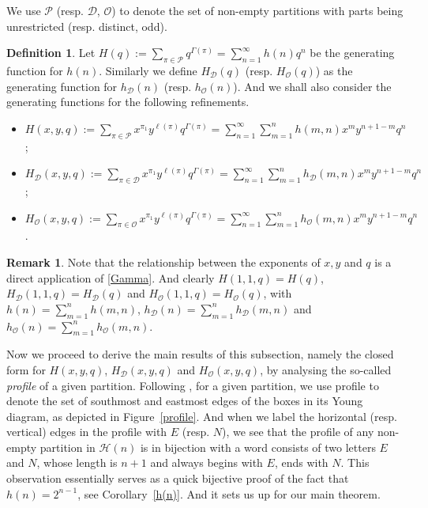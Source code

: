 \documentclass[12pt]{amsart}
\numberwithin{equation}{section}
\theoremstyle{plain}
\theoremstyle{definition}
\newtheorem{Def}[theorem]{Definition}
\newtheorem{remark}[theorem]{Remark}
\def\D{\mathcal{D}}
\def\O{\mathcal{O}}
\def\P{\mathcal{P}}
\def\H{\mathcal{H}}
\begin{document}
We use $\P$ (resp. $\D$, $\O$) to denote the set of non-empty partitions with parts being unrestricted (resp. distinct, odd).
\begin{Def}
Let $H(q):=\sum_{\pi\in\P}q^{\Gamma(\pi)}=\sum_{n=1}^{\infty}h(n)q^n$ be the generating function for $h(n)$. Similarly we define $H_{\D}(q)$ (resp. $H_{\O}(q)$) as the generating function for $h_{\D}(n)$ (resp. $h_{\O}(n)$). And we shall also consider the generating functions for the following refinements.
\begin{itemize}
\item $H(x,y,q):=\sum\limits_{\pi\in\P}x^{\pi_1}y^{\ell(\pi)}q^{\Gamma(\pi)}=\sum\limits_{n=1}^{\infty}\sum\limits_{m=1}^{n}h(m,n)x^my^{n+1-m}q^n$;
\item $H_{\D}(x,y,q):=\sum\limits_{\pi\in\D}x^{\pi_1}y^{\ell(\pi)}q^{\Gamma(\pi)}=\sum\limits_{n=1}^{\infty}\sum\limits_{m=1}^{n}h_{\D}(m,n)x^my^{n+1-m}q^n$;
\item $H_{\O}(x,y,q):=\sum\limits_{\pi\in\O}x^{\pi_1}y^{\ell(\pi)}q^{\Gamma(\pi)}=\sum\limits_{n=1}^{\infty}\sum\limits_{m=1}^{n}h_{\O}(m,n)x^my^{n+1-m}q^n$.
\end{itemize}
\end{Def}
\begin{remark}
Note that the relationship between the exponents of $x,y$ and $q$ is a direct application of \eqref{Gamma}. And clearly $H(1,1,q)=H(q)$, $H_{\D}(1,1,q)=H_{\D}(q)$ and $H_{\O}(1,1,q)=H_{\O}(q)$, with $h(n)=\sum_{m=1}^{n}h(m,n)$, $h_{\D}(n)=\sum_{m=1}^{n}h_{\D}(m,n)$ and $h_{\O}(n)=\sum_{m=1}^{n}h_{\O}(m,n)$.
\end{remark}
Now we proceed to derive the main results of this subsection, namely the closed form for $H(x,y,q)$, $H_{\D}(x,y,q)$ and $H_{\O}(x,y,q)$, by analysing the so-called \emph{profile} of a given partition. Following \cite{KN}, for a given partition, we use profile to denote the set of southmost and eastmost edges of the boxes in its Young diagram, as depicted in Figure~\ref{profile}. And when we label the horizontal (resp. vertical) edges in the profile with $E$ (resp. $N$), we see that the profile of any non-empty partition in $\H(n)$ is in bijection with a word consists of two letters $E$ and $N$, whose length is $n+1$ and always begins with $E$, ends with $N$. This observation essentially serves as a quick bijective proof of the fact that $h(n)=2^{n-1}$, see Corollary~\ref{h(n)}. And it sets us up for our main theorem.
\end{document}
